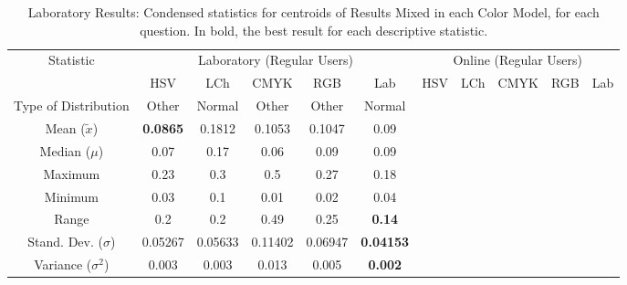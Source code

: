 \begin{table}[htbp]
  \resizebox{\textwidth}{!} {
  \begin{tabular}{@{}ccccccccccc@{}}
    \toprule
    \multirow{2}{*}{Statistic}                 & \multicolumn{5}{c}{Laboratory (Regular Users)}                                   & \multicolumn{5}{c}{Online (Regular Users)}     \\ \cmidrule(l){2-11}
                                               & HSV             & LCh    & CMYK   & RGB    & \multicolumn{1}{c|}{Lab}            & HSV & LCh & CMYK & RGB & Lab                   \\ \midrule
    \multicolumn{1}{|c|}{Type of Distribution} & Other           & Normal & Other  & Other  & \multicolumn{1}{c|}{Normal}         &     &     &      &     & \multicolumn{1}{c|}{} \\
    \multicolumn{1}{|c|}{Mean ($\tilde{x}$)}   & \textbf{0.0865} & 0.1812 & 0.1053 & 0.1047 & \multicolumn{1}{c|}{0.09}           &     &     &      &     & \multicolumn{1}{c|}{} \\
    \multicolumn{1}{|c|}{Median ($\mu$)}       & 0.07            & 0.17   & 0.06   & 0.09   & \multicolumn{1}{c|}{0.09}           &     &     &      &     & \multicolumn{1}{c|}{} \\
    \multicolumn{1}{|c|}{Maximum}              & 0.23            & 0.3    & 0.5    & 0.27   & \multicolumn{1}{c|}{0.18}           &     &     &      &     & \multicolumn{1}{c|}{} \\
    \multicolumn{1}{|c|}{Minimum}              & 0.03            & 0.1    & 0.01   & 0.02   & \multicolumn{1}{c|}{0.04}           &     &     &      &     & \multicolumn{1}{c|}{} \\
    \multicolumn{1}{|c|}{Range}                & 0.2             & 0.2    & 0.49   & 0.25   & \multicolumn{1}{c|}{\textbf{0.14}}  &     &     &      &     & \multicolumn{1}{c|}{} \\
    \multicolumn{1}{|c|}{Stand. Dev. ($\sigma$)}& 0.05267           & 0.05633  & 0.11402  & 0.06947  & \multicolumn{1}{c|}{\textbf{0.04153}} &     &     &      &     & \multicolumn{1}{c|}{} \\
    \multicolumn{1}{|c|}{Variance ($\sigma^2$)}& 0.003           & 0.003  & 0.013  & 0.005  & \multicolumn{1}{c|}{\textbf{0.002}} &     &     &      &     & \multicolumn{1}{c|}{} \\ \bottomrule
    \end{tabular}}
  \caption[Laboratory Results: Condensed statistics for centroids of Results Mixed in each Color Model]{Laboratory Results: Condensed statistics for centroids of Results Mixed in each Color Model, for each question. In bold, the best result for each descriptive statistic.}
  \label{table:colormodels_centroids_statistics}
\end{table}
